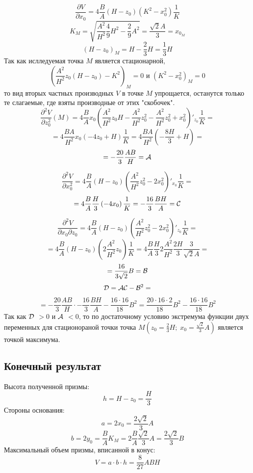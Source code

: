 \documentclass{article}
\begin{document}
$$
\frac{\partial V}{\partial x_0} = 4\frac{B}{A} (H-z_0) 
\left( 
K^2 - x_0^2
\right) \frac{1}{K}
$$
$$
K_M = \sqrt{\frac{A^2}{H^2} \frac{4}{9}H^2 - \frac{2}{9}A^2} = \frac{\sqrt{2}A}{3} = x_{0_M}
$$
$$
(H-z_0)_M = H - \frac{2}{3}H = \frac{1}{3}H
$$
Так как ислледуемая точка $M$ является стационарной,
$$
\left( 
\frac{A^2}{H^2}z_0 (H-z_0) - K^2
\right)_M = 0 \text{ и }
\left( 
K^2 - x_0^2
\right)_M = 0
$$
то вид вторых частных производных $V$ в точке $M$ упрощается, останутся только те слагаемые, где взяты производные от этих "скобочек".
$$
\frac{\partial^2 V}{\partial z_0^2} (M) = 4\frac{B}{A} x_0 
\left( 
\frac{A^2}{H^2}z_0H - \frac{A^2}{H^2}z_0^2 - \frac{A^2}{H^2} z_0^2 + x_0^2
\right)'_{z_0} \frac{1}{K} = 
$$
$$
= 4\frac{BA}{H^2} x_0 
\left( 
-4z_0 + H
\right)\frac{1}{K} =  
4\frac{BA}{H^2} 
\left( 
-\frac{8H}{3} + H
\right) = 
$$
$$
= -\frac{20}{3}\frac{AB}{H} = \cal A
$$


$$
\frac{\partial^2 V}{\partial x_0^2} = 4\frac{B}{A} (H-z_0) 
\left( 
\frac{A^2}{H^2}z_0^2 - 2x_0^2
\right)'_{x_0} \frac{1}{K} = 
$$
$$
= 4\frac{B}{A} \frac{H}{3} 
\left( 
 - 4x_0
\right) \frac{1}{K} = -\frac{16}{3}\frac{BH}{A} = \cal C
$$


$$
\frac{\partial^2 V}{\partial x_0 \partial z_0} = 4\frac{B}{A} (H-z_0) 
\left( 
\frac{A^2}{H^2}z_0^2 - 2x_0^2
\right)'_{z_0} \frac{1}{K} = 
$$
$$
= 4\frac{B}{A} (H-z_0) 
\left( 
2\frac{A^2}{H^2}z_0
\right) \frac{1}{K} = 
4\frac{B}{A} \frac{H}{3}
2\frac{A^2}{H^2} \frac{2H}{3}
 \frac{3}{\sqrt{2}A} =
$$
$$
= \frac{16}{3\sqrt{2}}B = \cal B
$$
$$
\cal D = \cal A \cal C - \cal B ^{\text{2}} = 
$$
$$
= -\frac{20}{3}\frac{AB}{H} \cdot -\frac{16}{3}\frac{BH}{A} - \frac{16 \cdot 16}{18}B^2 = \frac{20 \cdot 16 \cdot 2}{18}B^2 - \frac{16 \cdot 16}{18}B^2
$$
Так как $\cal D$ $> 0$ и $\cal A$ $< 0$, то по достаточному условию экстремума функции двух переменных для стационораной точки точка $M(z_0 = \frac{2}{3}H; \; x_0 = \frac{\sqrt{2}}{3}A)$ является точкой максимума.

\subsection{Конечный результат}
Высота полученной призмы:
$$
h = H - z_0 = \frac{H}{3}
$$
Стороны основания:
$$
a = 2x_0 = \frac{2\sqrt{2}}{3}A
$$
$$
b = 2y_0 = \frac{B}{A} K_M = 2 \frac{B}{A} \frac{\sqrt{2}}{3}A = \frac{2 \sqrt{2}}{3}B
$$
Максимальный объем призмы, вписанной в конус:
$$
V = a \cdot b \cdot h = \frac{8}{27}ABH
$$
\end{document}
